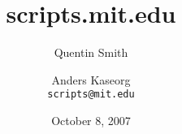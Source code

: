 \documentclass{beamer}
\title{scripts.mit.edu}
\author{Quentin Smith \and Anders Kaseorg \\ \texttt{scripts@mit.edu}}
\institute{Student Information Processing Board}
\date{October 8, 2007}
\begin{document}
\begin{frame}
    \titlepage
\end{frame}













\end{document}
